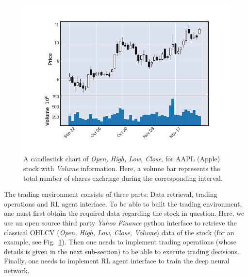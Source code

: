 \documentclass[twocolumn,aps,pra,superscriptaddress,nofootinbib,longbibliography]{revtex4-2}
\begin{document}
\begin{figure}\label{fig:OHLCVfig}
    \centering
    \includegraphics[scale=0.4]{Figs/Figures/OHLCV.png}
    \caption{A candlestick chart of \textit{Open, High, Low, Close}, for AAPL (Apple) stock with \textit{Volume} information. Here, a volume bar represents the total number of shares exchange during the corresponding interval.}
\end{figure}

The trading environment consists of three parts: Data retrieval, trading operations and RL agent interface. To be able to built the trading environment, one must first obtain the required data regarding the stock in question. Here, we use an open source third party \textit{Yahoo Finance} python interface to retrieve the classical OHLCV (\textit{Open, High, Low, Close, Volume}) data of the stock (for an example, see Fig.~\ref{fig:OHLCVfig}). Then one needs to implement trading operations (whose details is given in the next sub-section) to be able to execute trading decisions. Finally, one needs to implement RL agent interface to train the deep neural network. 
\end{document}
